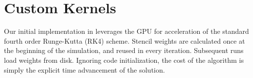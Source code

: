 \documentclass{report}
\begin{document}



\section{Custom Kernels}
\label{sec:custom_gpu_kernels}
 
%
%


Our initial implementation in \cite{BolligFlyerErlebacher2012} leverages the GPU for acceleration of the standard fourth order Runge-Kutta (RK4) scheme. Stencil weights are calculated once at the beginning of the simulation, and reused in every iteration. Subsequent runs load weights from disk. Ignoring code initialization, the cost of the algorithm is simply the explicit time advancement of the solution. 
\end{document}
